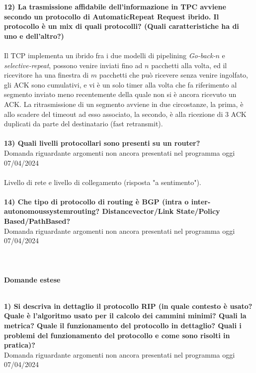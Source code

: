 \documentclass[12pt, letterpaper]{article}
\newcommand{\acc}{\\\hphantom{}\\}
\begin{document}
\textbf{12) La trasmissione affidabile dell'informazione in TPC avviene secondo un protocollo di AutomaticRepeat Request ibrido.
 Il protocollo è un mix di quali protocolli? (Quali caratteristiche ha di uno e dell'altro?)}\acc 
 Il TCP implementa un ibrido fra i due modelli di pipelining \textit{Go-back-$n$} e \textit{selective-repeat}, possono venire 
 inviati fino ad $n$ pacchetti alla volta, ed il ricevitore ha una finestra di $m$ pacchetti che può ricevere senza venire ingolfato, 
 gli ACK sono cumulativi, e vi è un solo timer alla volta che fa riferimento al segmento inviato meno recentemente della quale 
 non si è ancora ricevuto un ACK. La ritrasmissione di un segmento avviene in due circostanze, la prima, è allo scadere del 
 timeout ad esso associato, la secondo, è alla ricezione di 3 ACK duplicati da parte del destinatario (fast retransmit).\acc 


 \textbf{13) Quali livelli protocollari sono presenti su un router?}\\
 \color{red}Domanda riguardante argomenti
 non ancora presentati 
 nel programma oggi 07/04/2024\color{black}\acc
 Livello di rete e livello di collegamento (risposta "a sentimento").\acc 



 \textbf{14) Che tipo di protocollo di routing è BGP (intra o 
 inter-autonomoussystemrouting? Distancevector/Link State/Policy Based/PathBased?}\\
 \color{red}Domanda riguardante argomenti
 non ancora presentati 
 nel programma oggi 07/04/2024\color{black}\acc\hphantom{text}\acc
 \Large  \textbf{Domande estese}\acc
 \normalsize


 \textbf{1) Si descriva in dettaglio il protocollo RIP (in quale contesto è usato? Quale 
 è l'algoritmo usato per il calcolo dei cammini minimi? Quali la metrica? Quale il funzionamento 
 del protocollo in dettaglio? Quali i problemi del funzionamento del protocollo e come sono risolti in pratica)?}\\
 \color{red}Domanda riguardante argomenti
 non ancora presentati 
 nel programma oggi 07/04/2024\color{black}\acc\hphantom{text}\acc
\end{document}
